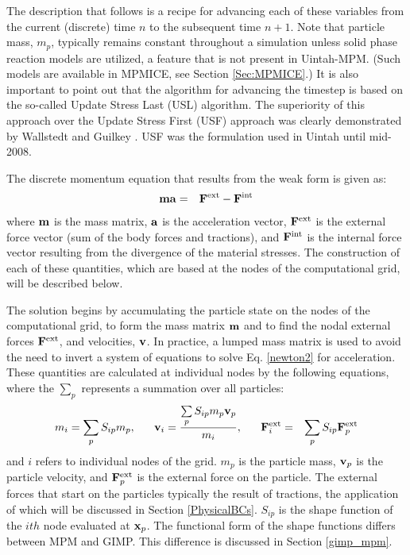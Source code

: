 The description that follows is a recipe for advancing each of these
variables from the current (discrete) time $n$ to the subsequent
time $n+1$.  Note that particle mass, $m_p$, typically remains constant
throughout a simulation unless solid phase reaction models are utilized,
a feature that is not present in Uintah-MPM.  (Such models are available
in MPMICE, see Section \ref{Sec:MPMICE}.)  It is also important to point
out that the algorithm for advancing the timestep is based on the so-called
Update Stress Last (USL) algorithm.  The superiority of this approach over
the Update Stress First (USF) approach was clearly demonstrated by Wallstedt
and Guilkey \cite{WallstedtJCP}.  USF was the formulation used in Uintah
until mid-2008.

The discrete momentum equation that results from the weak form is given as:
\begin{eqnarray}
        {\bf m} {\bf a} &=& {\bf F}^{\rm{ext}} - {\bf F}^{\rm{int}}  \label{newton2}
\end{eqnarray}
where ${\bf m}$ is the mass matrix, ${\bf a}$ is the acceleration vector,
${\bf F}^{\rm{ext}}$ is the external force vector (sum of the body forces and
tractions), and ${\bf F}^{\rm{int}}$ is the internal force vector resulting from
the divergence of the material stresses.  The construction of each of these
quantities, which are based at the nodes of the computational grid,
will be described below.

The solution begins by accumulating the particle state on the
nodes of the computational grid, to form the mass matrix ${\bf m}$ and to find
the nodal external forces ${\bf F}^{\rm{ext}}$, and velocities,
${\bf v}$.  In practice, a lumped mass matrix is used to avoid the need to
invert a system of equations to solve Eq. \ref{newton2} for acceleration.
These quantities are calculated at individual nodes by the following equations,
where the $\sum\limits_{p}$ represents a summation over all particles:
\begin{eqnarray}
m_i = \sum_{p} S_{ip} m_p,  \;\;\;\;\;\; 
{\bf v}_i = \frac{\sum\limits_{p} S_{ip} m_p {\bf v}_p}{m_i},  \;\;\;\;\;\;
{\bf F}^{\rm{ext}}_i &=& \sum_{p} S_{ip} {\bf F}^{\rm{ext}}_p
\label{accumulate}
\end{eqnarray}
and $i$ refers to individual nodes of the grid.  $m_p$ is the particle
mass, ${\bf v}_p$ is the particle velocity, and ${\bf F}^{\rm{ext}}_p$ is the
external force on the particle.  The external forces that start on the
particles typically the result of tractions, the application of which will
be discussed in Section \ref{PhysicalBCs}.
$S_{ip}$ is the shape function of the $ith$ node evaluated at ${\bf x}_p$.
The functional form of the shape functions differs between MPM and GIMP.
This difference is discussed in Section \ref{gimp_mpm}.

